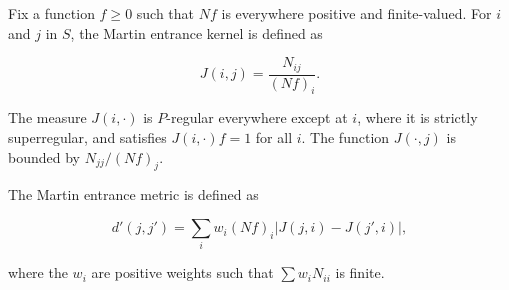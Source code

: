 Fix a function $f \geq 0$ such that $Nf$ is everywhere positive and finite-valued. For $i$ and $j$ in $S$, the Martin entrance kernel is defined as

$$J(i,j) = \frac{N_{ij}}{(Nf)_{i}}.$$

The measure $J(i,\cdot)$ is $P$-regular everywhere except at $i$, where it is strictly superregular, and satisfies $J(i,\cdot)f = 1$ for all $i$. The function $J(\cdot, j)$ is bounded by $N_{jj}/(Nf)_{j}$.

The Martin entrance metric is defined as

$$d'(j,j') = \sum_i w_i (Nf)_{i} |J(j,i) - J(j',i)|,$$

where the $w_i$ are positive weights such that $\sum w_i N_{ii}$ is finite.
